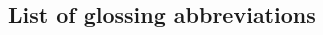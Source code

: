 \documentclass[a4paper, 12pt]{article}
\begin{document}
\newpage
			\subsection*{List of glossing abbreviations \vspace*{-1.5em}}
			
\begin{multicols}{2}
\printglossary[title={}, style=mcolindex, nonumberlist]
\end{multicols}

\printbibliography
\end{document}

